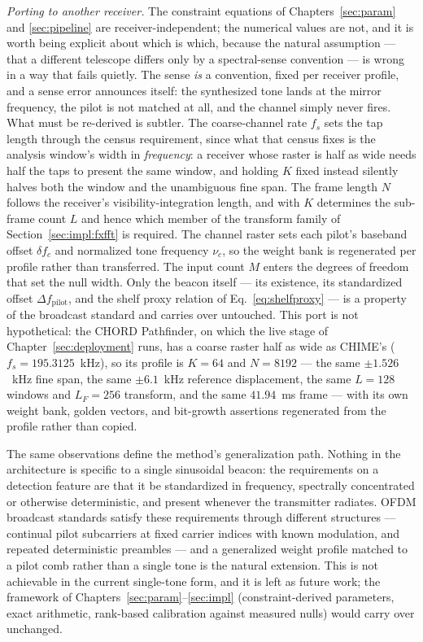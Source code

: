 \textit{Porting to another receiver.} The constraint equations of
Chapters~\ref{sec:param} and \ref{sec:pipeline} are receiver-independent; the
numerical values are not, and it is worth being explicit about which is which,
because the natural assumption --- that a different telescope differs only by a
spectral-sense convention --- is wrong in a way that fails quietly. The sense
\emph{is} a convention, fixed per receiver profile, and a sense error announces
itself: the synthesized tone lands at the mirror frequency, the pilot is not
matched at all, and the channel simply never fires. What must be re-derived is
subtler. The coarse-channel rate $f_s$ sets the tap length through the census
requirement, since what that census fixes is the analysis window's width in
\emph{frequency}: a receiver whose raster is half as wide needs half the taps to
present the same window, and holding $K$ fixed instead silently halves both the
window and the unambiguous fine span. The frame length $N$ follows the
receiver's visibility-integration length, and with $K$ determines the sub-frame
count $L$ and hence which member of the transform family of
Section~\ref{sec:impl:fxfft} is required. The channel raster sets each pilot's
baseband offset $\delta\!f_c$ and normalized tone frequency $\nu_c$, so the
weight bank is regenerated per profile rather than transferred. The input count
$M$ enters the degrees of freedom that set the null width. Only the beacon
itself --- its existence, its standardized offset $\Delta f_{\text{pilot}}$, and
the shelf proxy relation of Eq.~\eqref{eq:shelfproxy} --- is a property of the
broadcast standard and carries over untouched. This port is not hypothetical:
the CHORD Pathfinder, on which the live stage of Chapter~\ref{sec:deployment}
runs, has a coarse raster half as wide as CHIME's ($f_s = 195.3125$~kHz), so
its profile is $K = 64$ and $N = 8192$ --- the same $\pm 1.526$~kHz fine span,
the same $\pm 6.1$~kHz reference displacement, the same $L = 128$ windows and
$L_F = 256$ transform, and the same $41.94$~ms frame --- with its own weight
bank, golden vectors, and bit-growth assertions regenerated from the profile
rather than copied.

The same observations define the method's generalization path. Nothing in the architecture is specific to a single sinusoidal beacon: the requirements on a detection feature are that it be standardized in frequency, spectrally concentrated or otherwise deterministic, and present whenever the transmitter radiates. OFDM broadcast standards satisfy these requirements through different structures --- continual pilot subcarriers at fixed carrier indices with known modulation, and repeated deterministic preambles --- and a generalized weight profile matched to a pilot comb rather than a single tone is the natural extension. This is not achievable in the current single-tone form, and it is left as future work; the framework of Chapters~\ref{sec:param}--\ref{sec:impl} (constraint-derived parameters, exact arithmetic, rank-based calibration against measured nulls) would carry over unchanged.
